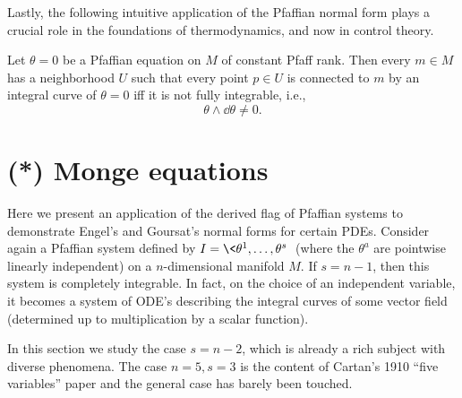 Lastly, the following intuitive application of the Pfaffian normal form plays a crucial role in the foundations of thermodynamics, and now in control theory.

\begin{thm}[Caratheodory]
    Let $\theta=0$ be a Pfaffian equation on $M$ of constant Pfaff rank. Then every $m\in M$ has a neighborhood $U$ such that every point $p\in U$ is connected to $m$ by an integral curve of $\theta=0$ iff it is not fully integrable, i.e.,
    \[\theta\wedge\dd\theta\neq 0.\]
\end{thm}






\section{(*) Monge equations}\label{sec: monge equations}

Here we present an application of the derived flag of Pfaffian systems to demonstrate Engel's and Goursat's normal forms for certain PDEs. Consider again a Pfaffian system defined by $I=\<\theta^1,\ldots,\theta^s\>$ (where the $\theta^a$ are pointwise linearly independent) on a $n$-dimensional manifold $M$. If $s=n-1$, then this system is completely integrable. In fact, on the choice of an independent variable, it becomes a system of ODE's describing the integral curves of some vector field (determined up to multiplication by a scalar function).

In this section we study the case $s=n-2$, which is already a rich subject with diverse phenomena. The case $n=5,s=3$ is the content of Cartan's 1910 ``five variables'' paper and the general case has barely been touched.

